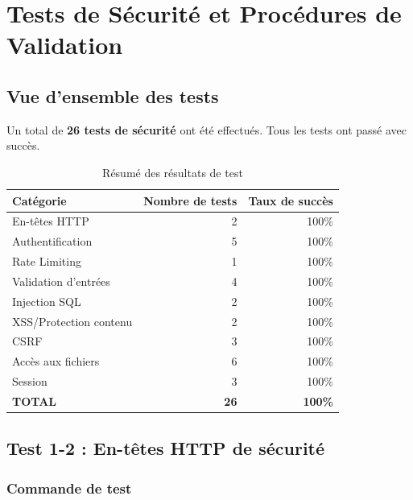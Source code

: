 \documentclass[11pt,a4paper,french]{report}
\begin{document}
\newpage


\chapter{Tests de Sécurité et Procédures de Validation}

\section{Vue d'ensemble des tests}

Un total de \textbf{26 tests de sécurité} ont été effectués. Tous les tests ont passé avec succès.

\begin{table}[H]
\centering
\caption{Résumé des résultats de test}
\begin{tabular}{|l|r|r|}
\hline
\textbf{Catégorie} & \textbf{Nombre de tests} & \textbf{Taux de succès} \\
\hline
En-têtes HTTP & 2 & 100\% \\
\hline
Authentification & 5 & 100\% \\
\hline
Rate Limiting & 1 & 100\% \\
\hline
Validation d'entrées & 4 & 100\% \\
\hline
Injection SQL & 2 & 100\% \\
\hline
XSS/Protection contenu & 2 & 100\% \\
\hline
CSRF & 3 & 100\% \\
\hline
Accès aux fichiers & 6 & 100\% \\
\hline
Session & 3 & 100\% \\
\hline
\textbf{TOTAL} & \textbf{26} & \textbf{100\%} \\
\hline
\end{tabular}
\end{table}

\newpage

\section{Test 1-2 : En-têtes HTTP de sécurité}

\subsection{Commande de test}
\end{document}
